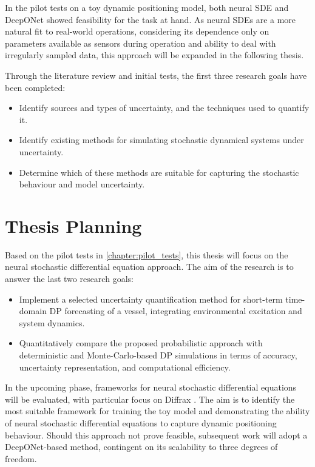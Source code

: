 In the pilot tests on a toy dynamic positioning model, both neural SDE and DeepONet showed feasibility for the task at
hand. As neural SDEs are a more natural fit to real-world operations, considering its dependence only on parameters
available as sensors during operation and ability to deal with irregularly sampled data, this approach will be expanded
in the following thesis.

Through the literature review and initial tests, the first three research goals have been completed: 

\begin{itemize}
    \item Identify sources and types of uncertainty, and the techniques used to quantify it. 
    \item  Identify existing methods for simulating stochastic dynamical systems under uncertainty.
    \item Determine which of these methods are suitable for capturing the stochastic behaviour and model uncertainty.
\end{itemize}

\section{Thesis Planning}
Based on the pilot tests in \cref{chapter:pilot_tests}, this thesis will focus on the neural stochastic differential
equation approach. The aim of the research is to answer the last two research goals:
\begin{itemize}
    \item Implement a selected uncertainty quantification method for short-term time-domain DP forecasting of a vessel, integrating environmental excitation and system dynamics.
    \item Quantitatively compare the proposed probabilistic approach with deterministic and Monte-Carlo-based DP simulations in terms of accuracy, uncertainty representation, and computational efficiency.
\end{itemize}

In the upcoming phase, frameworks for neural stochastic differential equations will be evaluated, with particular focus on Diffrax \parencite{kidgerNeuralDifferentialEquations2022}. The aim is to identify the most suitable framework for training the toy model and demonstrating the ability of neural stochastic differential equations to capture dynamic positioning behaviour. Should this approach not prove feasible, subsequent work will adopt a DeepONet-based method, contingent on its scalability to three degrees of freedom.

